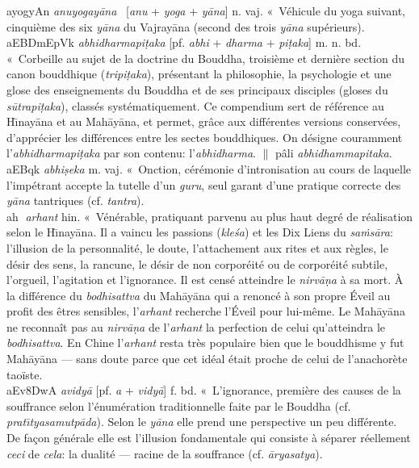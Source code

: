 \documentclass[a4paper,11pt,twocolumn]{article}
\begin{document}
{\dn ayogyAn} {\em anuyogay\={a}na} \ [{\em anu} + {\em yoga}
+ {\em y\={a}na}] n. vaj. «~Véhicule du yoga suivant\fg, cinquième des
six {\em y\={a}na} du Vajray\={a}na (second des trois
{\em y\={a}na} supérieurs). \\

{\dn aEBDm\0EpVk} {\em abhidharmapi\d{t}aka} [pf. {\em abhi} +
{\em dharma} + {\em pi\d{t}aka}] m. n. bd. «~Corbeille au sujet de la
doctrine du Bouddha\fg, troisième et dernière section
du canon bouddhique ({\em tripi\d{t}aka}), présentant la philosophie,
la psychologie et une glose des enseignements du Bouddha et de ses
principaux disciples (gloses du {\em s\={u}trapi\d{t}aka}), classés
systématiquement. Ce compendium sert de référence au
H\={\i}nay\={a}na et au Mah\={a}y\={a}na, et permet,
grâce aux différentes versions conservées, d'apprécier les différences
entre les sectes bouddhiques. On désigne couramment
l'{\em abhidharmapi\d{t}aka} par son contenu:
l'{\em abhidharma}. $\|$ pâli {\em abhidhammapitaka}. \\

{\dn aEBq\?k} {\em abhi\d{s}eka} m. vaj. «~Onction\fg, cérémonie
d'intronisation au cours de laquelle l'impétrant accepte la tutelle
d'un {\em guru}, seul garant d'une pratique correcte des
{\em y\={a}na} tantriques (cf. {\em tantra}). \\

{\dn ah\0^^F} {\em arhant} hin. «~Vénérable\fg, pratiquant parvenu au
plus haut degré de réalisation selon le H\={\i}nay\={a}na. Il a
vaincu les passions ({\em kle\'{s}a}) et les Dix Liens du
{\em sa\.{m}s\={a}ra}: l'illusion de la personnalité, le doute,
l'attachement aux rites et aux règles, le désir des sens, la rancune,
le désir de non corporéité ou de corporéité subtile, l'orgueil,
l'agitation et l'ignorance. Il est censé atteindre le
{\em nirv\={a}\d{n}a} à sa mort. À la différence du {\em bodhisattva}
du Mah\={a}y\={a}na qui a renoncé à son propre Éveil au profit
des êtres sensibles, l'{\em arhant} recherche l'Éveil pour
lui-même. Le Mah\={a}y\={a}na ne reconnaît pas au {\em
nirv\={a}\d{n}a} de l'{\em arhant} la perfection de celui qu'atteindra
le {\em bodhisattva}. En Chine l'{\em arhant\/} resta très populaire
bien que le bouddhisme y fut Mah\={a}y\={a}na --- sans doute parce que
cet idéal était proche de celui de l'anachorète taoïste. \\

{\dn aEv\38DwA} {\em avidy\={a}} [pf. {\em a} + {\em vidy\={a}}]
f. bd. «~L'ignorance\fg, première des causes de
la souffrance selon l'énumération traditionnelle faite par le
Bouddha (cf. {\em prat\={\i}tyasamutp\={a}da}). Selon le
{\em y\={a}na} elle prend une perspective un peu différente. De
fa\c{c}on générale elle est l'illusion fondamentale qui consiste à
séparer réellement {\em ceci\/} de {\em cela\/}: la dualité --- racine
de la souffrance (cf. {\em \={a}ryasatya}). \\
\end{document}

